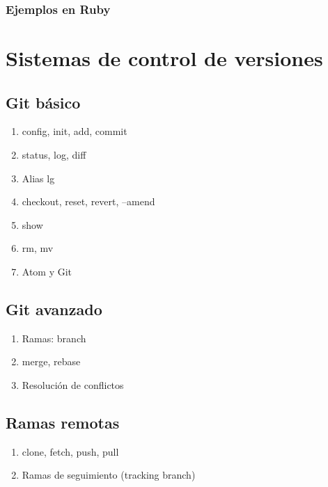 \documentclass[a4paper,11pt,spanish]{sphinxmanual}
\begin{document}
\subsection{Ejemplos en Ruby}
\label{\detokenize{introduccion:ejemplos-en-ruby}}

\chapter{Sistemas de control de versiones}
\label{\detokenize{introduccion:sistemas-de-control-de-versiones}}

\section{Git básico}
\label{\detokenize{introduccion:git-basico}}\begin{enumerate}
\item {} 
config, init, add, commit

\item {} 
status, log, diff

\item {} 
Alias lg

\item {} 
checkout, reset, revert, --amend

\item {} 
show

\item {} 
rm, mv

\item {} 
Atom y Git

\end{enumerate}


\section{Git avanzado}
\label{\detokenize{introduccion:git-avanzado}}\begin{enumerate}
\item {} 
Ramas: branch

\item {} 
merge, rebase

\item {} 
Resolución de conflictos

\end{enumerate}


\section{Ramas remotas}
\label{\detokenize{introduccion:ramas-remotas}}\begin{enumerate}
\item {} 
clone, fetch, push, pull

\item {} 
Ramas de seguimiento (tracking branch)

\end{enumerate}
\end{document}
